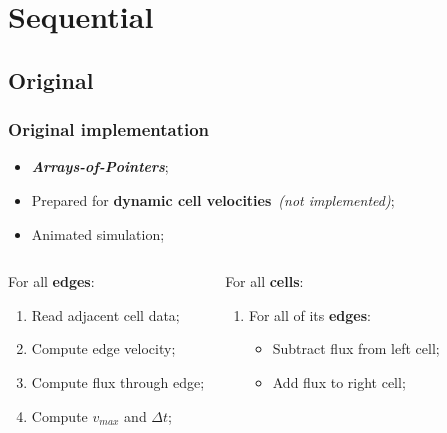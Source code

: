 \section{Sequential}


\subsection{Original}
\begin{frame}
	\frametitle{Original implementation}
	\begin{itemize}
		\item \textbf{\itshape Arrays-of-Pointers};
		\item Prepared for \textbf{dynamic cell velocities}\ \textit{(not implemented)};
		\item Animated simulation;
	\end{itemize}

	\begin{columns}
		\begin{block}{\computeflux}
			\smaller
			For all \textbf{edges}:
			\begin{enumerate}
				\item Read adjacent cell data;	
				\item Compute edge velocity;
				\item Compute flux through edge;
				\item Compute $v_{max}$ and $\Delta t$;
			\end{enumerate}
		\end{block}

		\begin{block}{\update}
			\smaller
			For all \textbf{cells}:
			\begin{enumerate}
				\item For all of its \textbf{edges}:
				\begin{itemize}\smaller
					\item Subtract flux from left cell;
					\item Add flux to right cell;
				\end{itemize}
			\end{enumerate}
		\end{block}
	\end{columns}
\end{frame}

